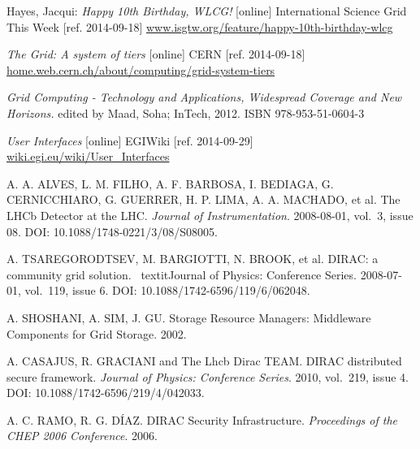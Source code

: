 
\def\bibname{Bibliography}
\begin{thebibliography}{99}
\addcontentsline{toc}{chapter}{\bibname}


	Hayes, Jacqui: 
	\emph{Happy 10th Birthday, WLCG!} [online]
	International Science Grid This Week [ref. 2014-09-18]
	\url{www.isgtw.org/feature/happy-10th-birthday-wlcg}

	\emph{The Grid: A system of tiers} [online] 
	CERN [ref. 2014-09-18]
	\url{home.web.cern.ch/about/computing/grid-system-tiers}

	\emph{Grid Computing - Technology and Applications, Widespread Coverage and New Horizons.} 
	edited by Maad, Soha; InTech, 2012.
	ISBN 978-953-51-0604-3

	\emph{User Interfaces} [online] 
	EGIWiki [ref. 2014-09-29]
	\url{wiki.egi.eu/wiki/User_Interfaces}
	
	A. A. ALVES, L. M. FILHO, A. F. BARBOSA, I. BEDIAGA, G. CERNICCHIARO, G. GUERRER, H. P. LIMA, A. A. MACHADO, et al. 
	The LHCb Detector at the LHC.
	\textit{Journal of Instrumentation}. 
	2008-08-01, vol.~3, issue 08. 
	DOI: 10.1088/1748-0221/3/08/S08005.
	
	A. TSAREGORODTSEV, M. BARGIOTTI, N. BROOK, et al. 
	DIRAC: a community grid solution. \
	textit{Journal of Physics: Conference Series}. 2008-07-01, vol.~119, issue 6.
	DOI: 10.1088/1742-6596/119/6/062048.
	
	A. SHOSHANI,  A. SIM, J. GU. 
	Storage Resource Managers: Middleware Components for Grid Storage. 
	2002.

	A. CASAJUS,  R. GRACIANI and The Lhcb Dirac TEAM. 
	DIRAC distributed secure framework. 
	\textit{Journal of Physics: Conference Series}. 2010, vol.~219, issue 4. 
	DOI: 10.1088/1742-6596/219/4/042033. 

	A. C. RAMO, R. G. DÍAZ. 
	DIRAC Security Infrastructure. 
	\textit{Proceedings of the CHEP 2006 Conference}. 2006. 
	

\end{thebibliography}
